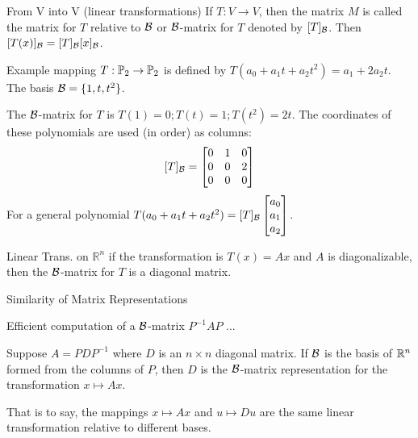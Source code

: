 \begin{card}
\begin{compactdesc}
    \item[From V into V] (linear transformations)
        If $T: V \to V$, then the matrix $M$ is called the matrix for $T$
        relative to $\mathcal{B}$ or $\mathcal{B}$-matrix for $T$ denoted by $[T]_{\mathcal{B}}$.
        Then $[T(x)]_{\mathcal{B}} = [T]_{\mathcal{B}} [x]_{\mathcal{B}}$.
    \item[Example] mapping $T: \mathbb{P}_2 \to \mathbb{P}_2$ is defined by
        $T(a_0 + a_1t + a_2t^2) = a_1 + 2a_2t$.
        The basis $\mathcal{B} = \{1,t,t^2\}$.

        The $\mathcal{B}$-matrix for $T$ is $T(1) = 0; T(t) = 1; T(t^2) = 2t$.
        The coordinates of these polynomials are used (in order) as columns:
        $$
        [T]_{\mathcal{B}} = \begin{bmatrix}0 & 1 & 0 \\ 0 & 0 & 2 \\ 0 & 0 & 0 \end{bmatrix}
        $$
        For a general polynomial $T(a_0 + a_1t + a_2t^2)
        = [T]_{\mathcal{B}} \begin{bmatrix}a_0 \\ a_1 \\ a_2 \end{bmatrix}$.
    \item[Linear Trans. on $\mathbb{R}^n$] if the transformation is $T(x) = Ax$
        and $A$ is diagonalizable, then the $\mathcal{B}$-matrix for $T$ is
        a diagonal matrix.
    \item[Similarity] of Matrix Representations
    \item[Efficient computation] of a $\mathcal{B}$-matrix $P^{-1}AP$ ...
    \end{compactdesc}

    \begin{theorem}
    Suppose $A = PDP^{-1}$ where $D$ is an $n \times n$ diagonal matrix.
    If $\mathcal{B}$ is the basis of $\mathbb{R}^n$ formed from the columns of $P$,
    then $D$ is the $\mathcal{B}$-matrix representation for the transformation
    $x \mapsto Ax$.

    That is to say, the mappings $x \mapsto Ax$ and $u \mapsto Du$ are the
    same linear transformation relative to different bases.
    \end{theorem}

\end{card}


